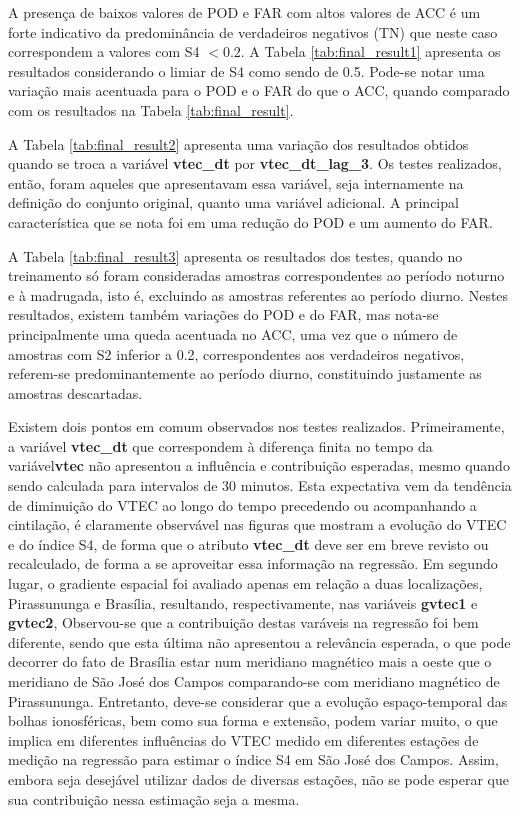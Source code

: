 A presença de baixos valores de POD e FAR com altos valores de ACC é um forte indicativo da predominância de verdadeiros negativos (TN) que neste caso correspondem a valores com S4 $<0.2$. A Tabela \ref{tab:final_result1} apresenta os resultados considerando o limiar de S4 como sendo de 0.5. Pode-se notar uma variação mais acentuada para o POD e o FAR do que o ACC, quando comparado com os resultados na Tabela \ref{tab:final_result}.

A Tabela \ref{tab:final_result2} apresenta uma variação dos resultados obtidos quando se troca a variável {\bf vtec\_dt} por {\bf vtec\_dt\_lag\_3}. Os testes realizados, então, foram aqueles que apresentavam essa variável, seja internamente na definição do conjunto original, quanto uma variável adicional. A principal característica que se nota foi em uma redução do POD e um aumento do FAR.


        A Tabela \ref{tab:final_result3} apresenta os resultados dos testes, quando no treinamento só foram consideradas amostras correspondentes ao período noturno e à madrugada, isto é, excluindo as amostras referentes ao período diurno. Nestes resultados, existem também variações do POD e do FAR, mas nota-se principalmente uma queda acentuada no ACC, uma vez que o número de amostras com S2 inferior a 0.2, correspondentes aos verdadeiros negativos, referem-se predominantemente ao período diurno, constituindo justamente as amostras descartadas.


      Existem dois pontos em comum observados nos testes realizados. Primeiramente, a variável {\bf vtec\_dt} que correspondem à diferença finita no tempo da variável{\bf vtec} não apresentou a influência e contribuição esperadas, mesmo quando sendo calculada para intervalos de 30 minutos. Esta expectativa vem da tendência de diminuição do VTEC ao longo do tempo precedendo ou acompanhando a cintilação, é claramente observável nas figuras que mostram a evolução do VTEC e do índice S4, de forma que o atributo {\bf vtec\_dt} deve ser em breve revisto ou recalculado,  de forma a se aproveitar essa informação na regressão. Em segundo lugar, o gradiente espacial foi avaliado apenas em relação a duas localizações, Pirassununga e Brasília, resultando, respectivamente, nas variáveis  {\bf gvtec1} e {\bf gvtec2}, Observou-se que a contribuição destas varáveis na regressão foi bem diferente, sendo que esta última não apresentou a relevância esperada, o que pode decorrer do fato de Brasília estar num meridiano magnético mais a oeste que o meridiano de São José dos Campos comparando-se com  meridiano magnético de Pirassununga. Entretanto, deve-se considerar que a evolução espaço-temporal das bolhas ionosféricas, bem como sua forma e extensão, podem variar muito, o que implica em diferentes influências do VTEC medido em diferentes estações de medição na regressão para estimar o índice S4 em São José dos Campos. Assim, embora seja desejável utilizar dados de diversas estações, não se pode esperar que sua contribuição nessa estimação seja a mesma.


